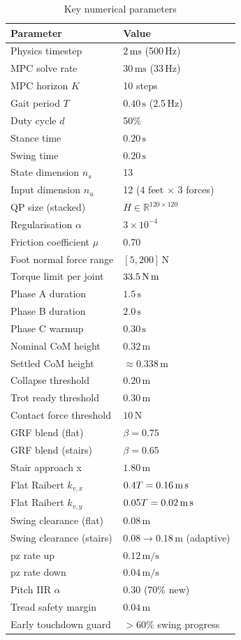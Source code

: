 \documentclass[12pt,a4paper]{report}
\newcommand{\R}{\mathbb{R}}
\begin{document}
\begin{table}[H]
\centering
\caption{Key numerical parameters}
\begin{tabular}{ll}
\toprule
\textbf{Parameter} & \textbf{Value} \\
\midrule
Physics timestep       & $2\,\text{ms}$ (500\,Hz) \\
MPC solve rate         & $30\,\text{ms}$ (33\,Hz) \\
MPC horizon $K$        & 10 steps \\
Gait period $T$        & $0.40\,\text{s}$ (2.5\,Hz) \\
Duty cycle $d$         & 50\% \\
Stance time            & $0.20\,\text{s}$ \\
Swing time             & $0.20\,\text{s}$ \\
State dimension $n_s$  & 13 \\
Input dimension $n_u$  & 12 (4 feet $\times$ 3 forces) \\
QP size (stacked)      & $H \in \R^{120\times120}$ \\
Regularisation $\alpha$ & $3\times10^{-4}$ \\
Friction coefficient $\mu$ & 0.70 \\
Foot normal force range & $[5, 200]\,\text{N}$ \\
Torque limit per joint & $33.5\,\text{N\,m}$ \\
Phase A duration       & $1.5\,\text{s}$ \\
Phase B duration       & $2.0\,\text{s}$ \\
Phase C warmup         & $0.30\,\text{s}$ \\
Nominal CoM height     & $0.32\,\text{m}$ \\
Settled CoM height     & $\approx 0.338\,\text{m}$ \\
Collapse threshold     & $0.20\,\text{m}$ \\
Trot ready threshold   & $0.30\,\text{m}$ \\
Contact force threshold & $10\,\text{N}$ \\
GRF blend (flat)       & $\beta = 0.75$ \\
GRF blend (stairs)     & $\beta = 0.65$ \\
Stair approach x       & $1.80\,\text{m}$ \\
Flat Raibert $k_{v,x}$ & $0.4T = 0.16\,\text{m\,s}$ \\
Flat Raibert $k_{v,y}$ & $0.05T = 0.02\,\text{m\,s}$ \\
Swing clearance (flat) & $0.08\,\text{m}$ \\
Swing clearance (stairs) & $0.08\to0.18\,\text{m}$ (adaptive) \\
pz rate up             & $0.12\,\text{m/s}$ \\
pz rate down           & $0.04\,\text{m/s}$ \\
Pitch IIR $\alpha$     & $0.30$ (70\% new) \\
Tread safety margin    & $0.04\,\text{m}$ \\
Early touchdown guard  & $>60\%$ swing progress \\
\bottomrule
\end{tabular}
\end{table}
\end{document}
